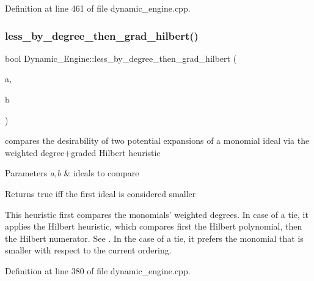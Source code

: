 Definition at line 461 of file dynamic\+\_\+engine.\+cpp.

\mbox{\label{namespace_dynamic___engine_ab5f217efe789e73d511ab04ae93942f1}} 
\subsubsection{\texorpdfstring{less\+\_\+by\+\_\+degree\+\_\+then\+\_\+grad\+\_\+hilbert()}{less\_by\_degree\_then\_grad\_hilbert()}}
{\footnotesize\ttfamily bool Dynamic\+\_\+\+Engine\+::less\+\_\+by\+\_\+degree\+\_\+then\+\_\+grad\+\_\+hilbert (\begin{DoxyParamCaption}\item[{\hyperlink{group___g_b_computation_class_dynamic___engine_1_1_p_p___with___ideal}{P\+P\+\_\+\+With\+\_\+\+Ideal} \&}]{a,  }\item[{\hyperlink{group___g_b_computation_class_dynamic___engine_1_1_p_p___with___ideal}{P\+P\+\_\+\+With\+\_\+\+Ideal} \&}]{b }\end{DoxyParamCaption})}



compares the desirability of two potential expansions of a monomial ideal via the weighted degree+graded Hilbert heuristic 


\begin{DoxyParams}{Parameters}
{\em a,b} & ideals to compare \\
\hline
\end{DoxyParams}
\begin{DoxyReturn}{Returns}
{\ttfamily true} iff the first ideal is considered smaller
\end{DoxyReturn}
This heuristic first compares the monomials' weighted degrees. In case of a tie, it applies the Hilbert heuristic, which compares first the Hilbert polynomial, then the Hilbert numerator. See \cite{CaboaraDynAlg}. In the case of a tie, it prefers the monomial that is smaller with respect to the current ordering. 

Definition at line 380 of file dynamic\+\_\+engine.\+cpp.

\mbox{\label{namespace_dynamic___engine_ae94f12023f4a0c1bf246afc31cd0538e}} 
